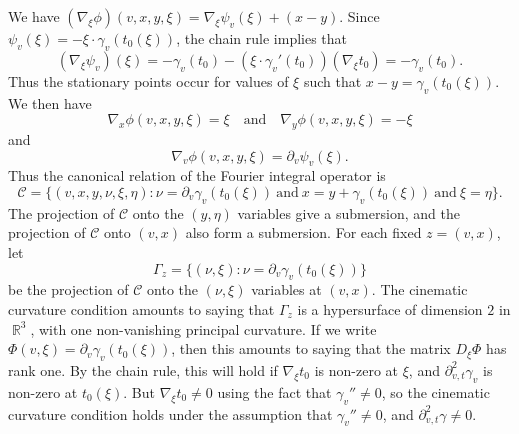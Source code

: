 \documentclass{article}
\theoremstyle{plain}
\theoremstyle{remark}
\theoremstyle{definition}
\DeclareMathOperator{\RR}{\mathbb{R}}
\begin{document}
We have $(\nabla_\xi \phi)(v,x,y,\xi) = \nabla_\xi \psi_v(\xi) + (x - y)$. Since $\psi_v(\xi) = - \xi \cdot \gamma_v(t_0(\xi))$, the chain rule implies that
%
\[ (\nabla_\xi \psi_v)(\xi) = - \gamma_v(t_0) - (\xi \cdot \gamma_v'(t_0)) (\nabla_\xi t_0) = - \gamma_v(t_0). \]
%
Thus the stationary points occur for values of $\xi$ such that $x - y = \gamma_v(t_0(\xi))$. We then have
%
\[ \nabla_x \phi(v,x,y,\xi) = \xi \quad\text{and}\quad \nabla_y \phi(v,x,y,\xi) = - \xi \]
%
and
%
\[ \nabla_v \phi(v,x,y,\xi) = \partial_v \psi_v(\xi). \]
%
Thus the canonical relation of the Fourier integral operator is
%
\[ \mathcal{C} = \Big\{ (v,x,y,\nu,\xi,\eta) : \nu = \partial_v \gamma_v(t_0(\xi))\ \text{and}\ x = y + \gamma_v(t_0(\xi))\ \text{and}\ \xi = \eta \Big\}. \]
%
The projection of $\mathcal{C}$ onto the $(y,\eta)$ variables give a submersion, and the projection of $\mathcal{C}$ onto $(v,x)$ also form a submersion. For each fixed $z = (v,x)$, let
%
\[ \Gamma_z = \Big\{ (\nu,\xi) : \nu = \partial_v \gamma_v(t_0(\xi)) \Big\} \]
%
be the projection of $\mathcal{C}$ onto the $(\nu,\xi)$ variables at $(v,x)$. The cinematic curvature condition amounts to saying that $\Gamma_z$ is a hypersurface of dimension $2$ in $\RR^3$, with one non-vanishing principal curvature. If we write $\Phi(v,\xi) = \partial_v \gamma_v(t_0(\xi))$, then this amounts to saying that the matrix $D_\xi \Phi$ has rank one. By the chain rule, this will hold if $\nabla_\xi t_0$ is non-zero at $\xi$, and $\partial^2_{v,t} \gamma_v$ is non-zero at $t_0(\xi)$. But  $\nabla_\xi t_0 \neq 0$ using the fact that $\gamma_v'' \neq 0$, so the cinematic curvature condition holds under the assumption that $\gamma_v'' \neq 0$, and $\partial^2_{v,t} \gamma \neq 0$.
\end{document}
